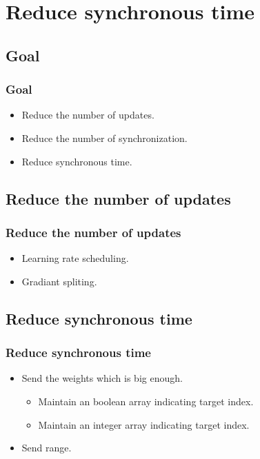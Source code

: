 \section{Reduce synchronous time}

\subsection{Goal}
\begin{frame}
    \frametitle{Goal}
	\begin{itemize}
		\item Reduce the number of updates.
		\item Reduce the number of synchronization.  
		\item Reduce synchronous time.
	\end{itemize}
\end{frame}

\subsection{Reduce the number of updates}
\begin{frame}
    \frametitle{Reduce the number of updates}
	\begin{itemize}
		\item Learning rate scheduling. 
		\item Gradiant spliting.  
	\end{itemize}
\end{frame}


\subsection{Reduce synchronous time}
\begin{frame}
    \frametitle{Reduce synchronous time}
    \begin{itemize}
	\item Send the weights which is big enough.  
		\begin{itemize}
			\item Maintain an boolean array indicating target index. 
			\item Maintain an integer array indicating target index.  
		\end{itemize}
	\item Send range.  	  
    \end{itemize}
\end{frame}

